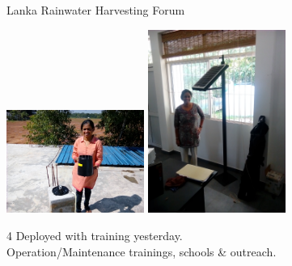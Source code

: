 \documentclass[xcolor=dvipsnames,beamer,unknownkeysallowed]{beamer} %
\begin{document}
\begin{frame}[fragile]{Lanka Rainwater Harvesting Forum}
\begin{center}
 \includegraphics[width=4.5cm]{tanuja1}
  \hspace{5mm}
 \includegraphics[width=4.5cm]{tanuja2}\\
\end{center}

\begin{center}
4 Deployed with training yesterday. \\
Operation/Maintenance trainings, schools \& outreach.
\end{center}

\end{frame}
\end{document}
